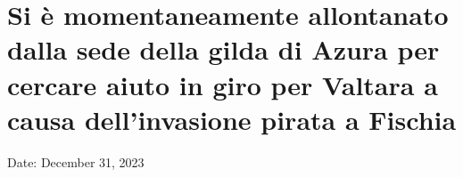 \section{Si è momentaneamente allontanato dalla sede della gilda di
Azura per cercare aiuto in giro per Valtara a causa dell'invasione
pirata a
Fischia}\label{si-uxe8-momentaneamente-allontanato-dalla-sede-della-gilda-di-azura-per-cercare-aiuto-in-giro-per-valtara-a-causa-dellinvasione-pirata-a-fischia}

Date: December 31, 2023
